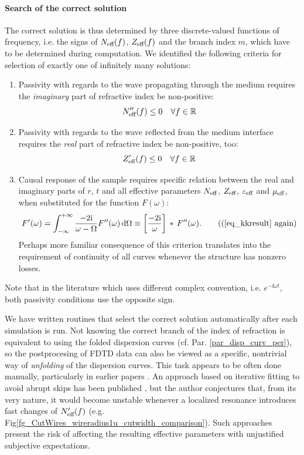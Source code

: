 \paragraph{Search of the correct solution} %
The correct solution is thus determined by three discrete-valued functions of frequency, i.e. the signs of $N_{\text{eff} }(f)$, $Z_{\text{eff} }(f)$ and the branch index $m$, which have to be determined during computation. 
We identified the following criteria for selection of exactly one of infinitely many solutions:
\begin{enumerate}
	\item{Passivity with regards to the wave propagating through the medium requires the \textit{imaginary} part of refractive index be non-positive: 
		 \begin{equation} N_{\text{eff} }''(f) \leq 0 \quad \forall f\in \mathbb{R} \label{eq_Neff_pass}\end{equation}
		 } 
	 \item{Passivity with regards to the wave reflected from the medium interface requires the \textit{real} part of refractive index be non-positive, too: 
		 \begin{equation} Z_{\text{eff} }'(f) \leq 0 \quad \forall f\in \mathbb{R} \label{eq_Zeff_pass}\end{equation}
		 } 
	 \item{Causal response of the sample requires specific relation between the real and imaginary parts of $r$, $t$ and all effective parameters $N_{\text{eff} }$, $Z_{\text{eff} }$, $\varepsilon_{\text{eff} }$ and $\mu_{\text{eff} }$, when substituted for the function $F(\omega)$:
		 \begin{equation} 
F'(\omega) = \int_{-\infty}^{+\infty}  \frac{-2\ii}{\omega - \Omega} F''(\omega) \,\mbox{d}\Omega  \equiv  \left[\frac{-2\ii}{\omega}\right]\,\ast\,F''(\omega). \tag{(\ref{eq_kkresult} \again}\end{equation} 
Perhaps more familiar consequence of this criterion translates into the requirement of continuity of all curves whenever the structure has nonzero losses.
		 } 
\end{enumerate}
Note that in the literature which uses different complex convention, i.e. $e^{-\ii\omega t}$, both passivity conditions use the opposite sign.

We have written routines that select the correct solution automatically after each simulation is run. Not knowing the correct branch of the index of refraction is equivalent to using the folded dispersion curves (cf. Par. \ref{par_disp_curv_per}), %
so the postprocesing of FDTD data can also be viewed as a specific, nontrivial way of \textit{unfolding} of the dispersion curves. This task appears to be often done manually, particularly in earlier papers \cite{smith2002determination}. An approach based on iterative fitting to avoid abrupt skips has been published \cite{chen2004robust}, but the author conjectures that, from its very nature, it would become unstable whenever a localized resonance introduces fast changes of $N_{\text{eff} }'(f)$ (e.g. Fig\ref{fg_CutWires_wireradius1u_cutwidth_comparison}). Such approaches present the risk of affecting the resulting effective parameters with unjustified subjective expectations.

